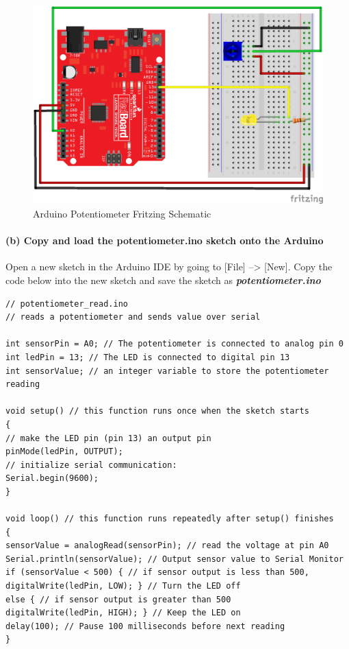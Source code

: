 \documentclass[11pt]{article}
\begin{document}
\begin{figure}[H]
\centering
\includegraphics{images/redboard_pot_led_fritzing.png}
\caption{Arduino Potentiometer Fritzing Schematic}
\end{figure}

\newpage

    \hypertarget{b-copy-and-load-the-potentiometer.ino-sketch-onto-the-arduino}{%
\paragraph{(b) Copy and load the potentiometer.ino sketch onto the
Arduino}\label{b-copy-and-load-the-potentiometer.ino-sketch-onto-the-arduino}}

Open a new sketch in the Arduino IDE by going to {[}File{]}
--\textgreater{} {[}New{]}. Copy the code below into the new sketch and
save the sketch as \textbf{\emph{potentiometer.ino}}

\begin{verbatim}
// potentiometer_read.ino
// reads a potentiometer and sends value over serial

int sensorPin = A0; // The potentiometer is connected to analog pin 0
int ledPin = 13; // The LED is connected to digital pin 13
int sensorValue; // an integer variable to store the potentiometer reading

void setup() // this function runs once when the sketch starts
{
// make the LED pin (pin 13) an output pin
pinMode(ledPin, OUTPUT);
// initialize serial communication:
Serial.begin(9600);
}

void loop() // this function runs repeatedly after setup() finishes
{
sensorValue = analogRead(sensorPin); // read the voltage at pin A0
Serial.println(sensorValue); // Output sensor value to Serial Monitor
if (sensorValue < 500) { // if sensor output is less than 500,
digitalWrite(ledPin, LOW); } // Turn the LED off
else { // if sensor output is greater than 500
digitalWrite(ledPin, HIGH); } // Keep the LED on
delay(100); // Pause 100 milliseconds before next reading
}
\end{verbatim}
\end{document}
